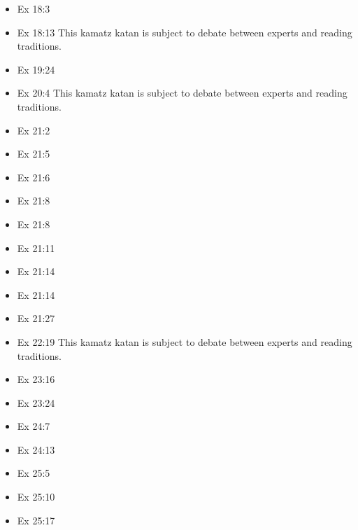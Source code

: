 \documentclass[14pt]{article}
\begin{document}
\begin{multicols}{2}
\begin{itemize}
\item Ex 18:3

\item Ex 18:13 This kamatz katan is subject to debate between experts and reading traditions.

\item Ex 19:24

\item Ex 20:4 This kamatz katan is subject to debate between experts and reading traditions.

\item Ex 21:2

\item Ex 21:5

\item Ex 21:6

\item Ex 21:8

\item Ex 21:8

\item Ex 21:11

\item Ex 21:14

\item Ex 21:14

\item Ex 21:27

\item Ex 22:19 This kamatz katan is subject to debate between experts and reading traditions.

\item Ex 23:16

\item Ex 23:24

\item Ex 24:7

\item Ex 24:13

\item Ex 25:5

\item Ex 25:10

\item Ex 25:17


\end{itemize}
\end{multicols}
\end{document}

